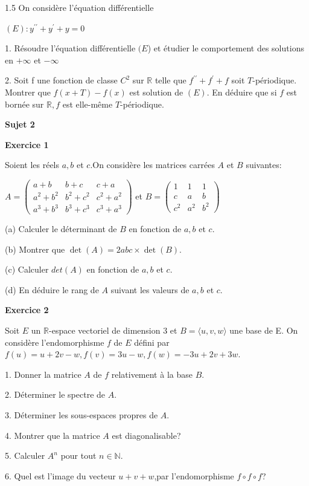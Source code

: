 \documentclass[12pt]{article}
\begin{document}
\begin{spacing}{1.5}
On considère l'équation différentielle
 
 $(E): y^{\prime\prime}+y^{\prime}+y=0$
 
 1. Résoudre l'équation différentielle $(E$) et étudier le comportement des solutions en $+\infty$ et $-\infty$

 2. Soit f une fonction de classe $C^2$ sur $\mathbb{R}$ telle que $f^{\prime\prime}+f^{\prime}+f$ soit $T$-périodique. Montrer que $f(x +T)-f(x)$ est solution de $(E)$. En déduire que si $f$ est bornée sur $\mathbb{R}, f$ est elle-même $T$-périodique.
 
\medskip\textbf{Sujet 2}

\textbf{Exercice 1}

 Soient les réels $a,b$ et $c$.On considère les matrices carrées $A$ et $B$ suivantes:

$
A=\begin{pmatrix}
a+b & b+c & c+a \\ 
a^2+b^2 & b^2+c^2 & c^2+a^2 \\ 
a^3+b^3 & b^3+c^3 & c^3+a^3
\end{pmatrix}$ et $B=\begin{pmatrix}
1 & 1 & 1 \\ 
c & a & b \\ 
c^2 & a^2 & b^2
\end{pmatrix} $

(a) Calculer le déterminant de $B$ en fonction de $a,b$ et $c$.

(b) Montrer que $\det(A)=2abc\times\det(B)$.

(c) Calculer $det(A)$ en fonction de $a,b$ et $c$.

(d) En déduire le rang de $A$ suivant les valeurs de $a,b$ et $c$.

\textbf{Exercice 2 }

 Soit $E$ un $\mathbb{R}$-espace vectoriel de dimension 3 et $B=\langle u,v,w\rangle$ une base de E.
 On considère l'endomorphisme $f$ de $E$ défini par
  $f(u)=u+2v-w, f(v)=3u-w, f(w)=-3u+2v+3w$.
 
 1. Donner la matrice $A$ de $f$  relativement à la base $B$.
 
 2. Déterminer le spectre de $A$.
 
 3. Déterminer les sous-espaces propres de $A$.
 
 4. Montrer que la matrice $A$ est diagonalisable?
 
 5. Calculer $A^n$ pour tout $n\in \mathbb{N}$.
 
 6. Quel est l'image du vecteur $u+v+w$,par l'endomorphisme $f\circ f\circ f$?
 

\end{spacing}
\end{document}

